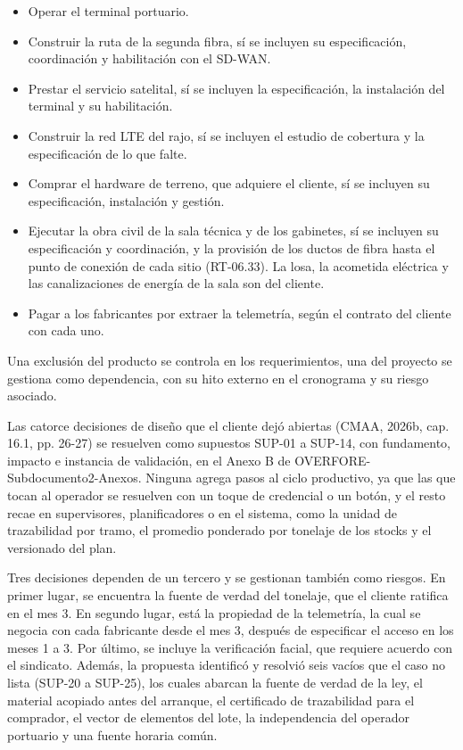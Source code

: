 \documentclass[subdoc]{../../comun/overfore}
\begin{document}
\begin{itemize}
\item Operar el terminal portuario.
\item Construir la ruta de la segunda fibra, sí se incluyen su especificación, coordinación y habilitación con el SD-WAN.
\item Prestar el servicio satelital, sí se incluyen la especificación, la instalación del terminal y su habilitación.
\item Construir la red LTE del rajo, sí se incluyen el estudio de cobertura y la especificación de lo que falte.
\item Comprar el hardware de terreno, que adquiere el cliente, sí se incluyen su especificación, instalación y gestión.
\item Ejecutar la obra civil de la sala técnica y de los gabinetes, sí se incluyen su especificación y coordinación, y la provisión de los ductos de fibra hasta el punto de conexión de cada sitio (RT-06.33). La losa, la acometida eléctrica y las canalizaciones de energía de la sala son del cliente.
\item Pagar a los fabricantes por extraer la telemetría, según el contrato del cliente con cada uno.
\end{itemize}
Una exclusión del producto se controla en los requerimientos, una del proyecto se gestiona como dependencia, con su hito externo en el cronograma y su riesgo asociado.

Las catorce decisiones de diseño que el cliente dejó abiertas (CMAA, 2026b, cap. 16.1, pp. 26-27) se resuelven como supuestos SUP-01 a SUP-14, con fundamento, impacto e instancia de validación, en el Anexo B de OVERFORE-Subdocumento2-Anexos. Ninguna agrega pasos al ciclo productivo, ya que las que tocan al operador se resuelven con un toque de credencial o un botón, y el resto recae en supervisores, planificadores o en el sistema, como la unidad de trazabilidad por tramo, el promedio ponderado por tonelaje de los stocks y el versionado del plan.

Tres decisiones dependen de un tercero y se gestionan también como riesgos. En primer lugar, se encuentra la fuente de verdad del tonelaje, que el cliente ratifica en el mes 3. En segundo lugar, está la propiedad de la telemetría, la cual se negocia con cada fabricante desde el mes 3, después de especificar el acceso en los meses 1 a 3. Por último, se incluye la verificación facial, que requiere acuerdo con el sindicato. Además, la propuesta identificó y resolvió seis vacíos que el caso no lista (SUP-20 a SUP-25), los cuales abarcan la fuente de verdad de la ley, el material acopiado antes del arranque, el certificado de trazabilidad para el comprador, el vector de elementos del lote, la independencia del operador portuario y una fuente horaria común.
\end{document}

